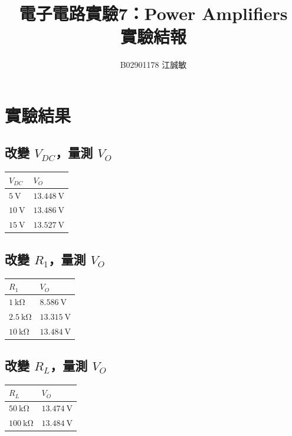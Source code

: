 \documentclass[12pt, a4paper]{article}
\title{ \bf {\Huge 電子電路實驗7：Power Amplifiers}\\ 實驗結報}
\author{B02901178 江誠敏}
\begin{document}
\maketitle


\section{實驗結果}
\subsection{改變 $V_{DC}$，量測 $V_O$}
\begin{center}
	\begin{tabular}{p{3cm}p{4.5cm}}
	\hline
  $V_{DC}$ & $V_{O}$ \\
  \hline
  \hline
  $\SI{5}\V$ & $\SI{13.448}\V$ \\
  \hline
  $\SI{10}\V$ & $\SI{13.486}\V$ \\
  \hline
  $\SI{15}\V$ & $\SI{13.527}\V$ \\
  \hline
  \end{tabular}
\end{center}

\subsection{改變 $R_1$，量測 $V_O$}
\begin{center}
	\begin{tabular}{p{3cm}p{4.5cm}}
	\hline
  $R_{1}$ & $V_{O}$ \\
  \hline
  \hline
  $\SI{1}\kohm$ & $\SI{8.586}\V$ \\
  \hline
  $\SI{2.5}\kohm$ & $\SI{13.315}\V$ \\
  \hline
  $\SI{10}\kohm$ & $\SI{13.484}\V$ \\
  \hline
  \end{tabular}
\end{center}

\subsection{改變 $R_L$，量測 $V_O$}
\begin{center}
	\begin{tabular}{p{3cm}p{4.5cm}}
	\hline
  $R_{L}$ & $V_{O}$ \\
  \hline
  \hline
  $\SI{50}\kohm$ & $\SI{13.474}\V$ \\
  \hline
  $\SI{100}\kohm$ & $\SI{13.484}\V$ \\
  \hline
  \end{tabular}
\end{center}
\end{document}
